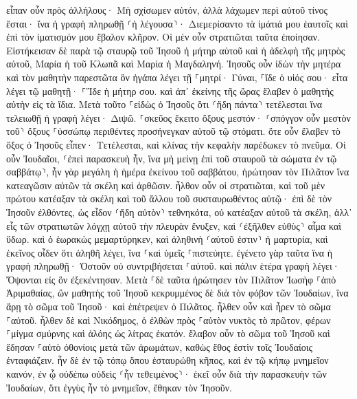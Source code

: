 \documentclass[twoside, 9pt]{extreport}
\begin{document}
εἶπαν οὖν πρὸς ἀλλήλους· Μὴ σχίσωμεν αὐτόν, ἀλλὰ λάχωμεν περὶ αὐτοῦ τίνος ἔσται· ἵνα ἡ γραφὴ πληρωθῇ ⸂ἡ λέγουσα⸃· Διεμερίσαντο τὰ ἱμάτιά μου ἑαυτοῖς καὶ ἐπὶ τὸν ἱματισμόν μου ἔβαλον κλῆρον. Οἱ μὲν οὖν στρατιῶται ταῦτα ἐποίησαν. 
Εἱστήκεισαν δὲ παρὰ τῷ σταυρῷ τοῦ Ἰησοῦ ἡ μήτηρ αὐτοῦ καὶ ἡ ἀδελφὴ τῆς μητρὸς αὐτοῦ, Μαρία ἡ τοῦ Κλωπᾶ καὶ Μαρία ἡ Μαγδαληνή. 
Ἰησοῦς οὖν ἰδὼν τὴν μητέρα καὶ τὸν μαθητὴν παρεστῶτα ὃν ἠγάπα λέγει τῇ ⸀μητρί· Γύναι, ⸀ἴδε ὁ υἱός σου· 
εἶτα λέγει τῷ μαθητῇ· ⸀Ἴδε ἡ μήτηρ σου. καὶ ἀπ᾽ ἐκείνης τῆς ὥρας ἔλαβεν ὁ μαθητὴς αὐτὴν εἰς τὰ ἴδια. 
Μετὰ τοῦτο ⸀εἰδὼς ὁ Ἰησοῦς ὅτι ⸂ἤδη πάντα⸃ τετέλεσται ἵνα τελειωθῇ ἡ γραφὴ λέγει· Διψῶ. 
⸀σκεῦος ἔκειτο ὄξους μεστόν· ⸂σπόγγον οὖν μεστὸν τοῦ⸃ ὄξους ⸀ὑσσώπῳ περιθέντες προσήνεγκαν αὐτοῦ τῷ στόματι. 
ὅτε οὖν ἔλαβεν τὸ ὄξος ὁ Ἰησοῦς εἶπεν· Τετέλεσται, καὶ κλίνας τὴν κεφαλὴν παρέδωκεν τὸ πνεῦμα. 
Οἱ οὖν Ἰουδαῖοι, ⸂ἐπεὶ παρασκευὴ ἦν, ἵνα μὴ μείνῃ ἐπὶ τοῦ σταυροῦ τὰ σώματα ἐν τῷ σαββάτῳ⸃, ἦν γὰρ μεγάλη ἡ ἡμέρα ἐκείνου τοῦ σαββάτου, ἠρώτησαν τὸν Πιλᾶτον ἵνα κατεαγῶσιν αὐτῶν τὰ σκέλη καὶ ἀρθῶσιν. 
ἦλθον οὖν οἱ στρατιῶται, καὶ τοῦ μὲν πρώτου κατέαξαν τὰ σκέλη καὶ τοῦ ἄλλου τοῦ συσταυρωθέντος αὐτῷ· 
ἐπὶ δὲ τὸν Ἰησοῦν ἐλθόντες, ὡς εἶδον ⸂ἤδη αὐτὸν⸃ τεθνηκότα, οὐ κατέαξαν αὐτοῦ τὰ σκέλη, 
ἀλλ᾽ εἷς τῶν στρατιωτῶν λόγχῃ αὐτοῦ τὴν πλευρὰν ἔνυξεν, καὶ ⸂ἐξῆλθεν εὐθὺς⸃ αἷμα καὶ ὕδωρ. 
καὶ ὁ ἑωρακὼς μεμαρτύρηκεν, καὶ ἀληθινὴ ⸂αὐτοῦ ἐστιν⸃ ἡ μαρτυρία, καὶ ἐκεῖνος οἶδεν ὅτι ἀληθῆ λέγει, ἵνα ⸀καὶ ὑμεῖς ⸀πιστεύητε. 
ἐγένετο γὰρ ταῦτα ἵνα ἡ γραφὴ πληρωθῇ· Ὀστοῦν οὐ συντριβήσεται ⸀αὐτοῦ. 
καὶ πάλιν ἑτέρα γραφὴ λέγει· Ὄψονται εἰς ὃν ἐξεκέντησαν. 
Μετὰ ⸀δὲ ταῦτα ἠρώτησεν τὸν Πιλᾶτον Ἰωσὴφ ⸀ἀπὸ Ἁριμαθαίας, ὢν μαθητὴς τοῦ Ἰησοῦ κεκρυμμένος δὲ διὰ τὸν φόβον τῶν Ἰουδαίων, ἵνα ἄρῃ τὸ σῶμα τοῦ Ἰησοῦ· καὶ ἐπέτρεψεν ὁ Πιλᾶτος. ἦλθεν οὖν καὶ ἦρεν τὸ σῶμα ⸀αὐτοῦ. 
ἦλθεν δὲ καὶ Νικόδημος, ὁ ἐλθὼν πρὸς ⸀αὐτὸν νυκτὸς τὸ πρῶτον, φέρων ⸀μίγμα σμύρνης καὶ ἀλόης ὡς λίτρας ἑκατόν. 
ἔλαβον οὖν τὸ σῶμα τοῦ Ἰησοῦ καὶ ἔδησαν ⸀αὐτὸ ὀθονίοις μετὰ τῶν ἀρωμάτων, καθὼς ἔθος ἐστὶν τοῖς Ἰουδαίοις ἐνταφιάζειν. 
ἦν δὲ ἐν τῷ τόπῳ ὅπου ἐσταυρώθη κῆπος, καὶ ἐν τῷ κήπῳ μνημεῖον καινόν, ἐν ᾧ οὐδέπω οὐδεὶς ⸂ἦν τεθειμένος⸃· 
ἐκεῖ οὖν διὰ τὴν παρασκευὴν τῶν Ἰουδαίων, ὅτι ἐγγὺς ἦν τὸ μνημεῖον, ἔθηκαν τὸν Ἰησοῦν. 
\end{document}
